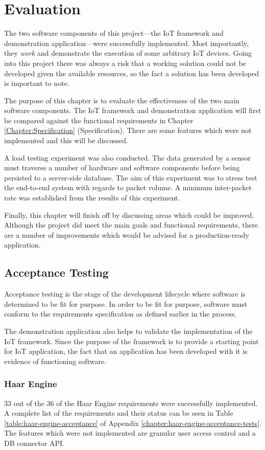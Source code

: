 \chapter{Evaluation}
  The two software components of this project---the IoT framework and demonstration application---were successfully implemented. Most importantly, they \textit{work} and demonstrate the execution of some arbitrary IoT devices. Going into this project there was always a risk that a working solution could not be developed given the available resources, so the fact a solution has been developed is important to note. 

  The purpose of this chapter is to evaluate the effectiveness of the two main software components. The IoT framework and demonstration application will first be compared against the functional requirements in Chapter \ref{Chapter:Specification} (Specification). There are some features which were not implemented and this will be discussed.

  A load testing experiment was also conducted. The data generated by a sensor must traverse a number of hardware and software components before being persisted to a server-side database. The aim of this experiment was to stress test the end-to-end system with regards to packet volume. A minimum inter-packet rate was established from the results of this experiment.

  Finally, this chapter will finish off by discussing areas which could be improved. Although the project did meet the main goals and functional requirements, there are a number of improvements which would be advised for a production-ready application.

  \section{Acceptance Testing}
    Acceptance testing is the stage of the development lifecycle where software is determined to be fit for purpose. In order to be fit for purpose, software must conform to the requirements specification as defined earlier in the process.

    The demonstration application also helps to validate the implementation of the IoT framework. Since the purpose of the framework is to provide a starting point for IoT application, the fact that an application has been developed with it is evidence of functioning software.

    \subsection{Haar Engine}
      33 out of the 36 of the Haar Engine requirements were successfully implemented. A complete list of the requirements and their status can be seen in Table \ref{table:haar-engine-acceptance} of Appendix \ref{chapter:haar-engine-acceptance-tests}. The features which were not implemented are granular user access control and a DB connector API.

